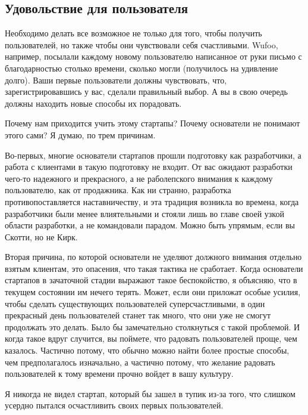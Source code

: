 \documentclass[ebook,12pt,oneside,openany]{memoir}
\begin{document}
\subsection{Удовольствие для пользователя}

Необходимо делать все возможное не только для того, чтобы получить
пользователей, но также чтобы они чувствовали себя счастливыми. Wufoo,
например, посылали каждому новому пользователю написанное от руки
письмо с благодарностью столько времени, сколько могли (получилось на
удивление долго). Ваши первые пользователи должны чувствовать, что,
зарегистрировавшись у вас, сделали правильный выбор. А вы в свою
очередь должны находить новые способы их порадовать. \newline

Почему нам приходится учить этому стартапы? Почему основатели не
понимают этого сами? Я думаю, по трем причинам. \newline

Во-первых, многие основатели стартапов прошли подготовку как
разработчики, а работа с клиентами в такую подготовку не входит. От
вас ожидают разработки чего-то надежного и прекрасного, а не
раболепского внимания к каждому пользователю, как от продажника. Как
ни странно, разработка противопоставляется наставничеству, и эта
традиция возникла во времена, когда разработчики были менее
влиятельными и стояли лишь во главе своей узкой области разработки, а
не командовали парадом. Можно быть упрямым, если вы Скотти, но не
Кирк. \newline

Вторая причина, по которой основатели не уделяют должного внимания
отдельно взятым клиентам, это опасения, что такая тактика не
сработает. Когда основатели стартапов в зачаточной стадии выражают
такое беспокойство, я объясняю, что в текущем состоянии им нечего
терять. Может, если они приложат особые усилия, чтобы сделать
существующих пользователей суперсчастливыми, в один прекрасный день
пользователей станет так много, что они уже не смогут продолжать это
делать. Было бы замечательно столкнуться с такой проблемой. И когда
такое вдруг случится, вы поймете, что радовать пользователей проще,
чем казалось. Частично потому, что обычно можно найти более простые
способы, чем предполагалось изначально, а частично потому, что желание
радовать пользователей к тому времени прочно войдет в вашу культуру.
\newline

Я никогда не видел стартап, который бы зашел в тупик из-за того, что
слишком усердно пытался осчастливить своих первых пользователей.
\newline
\end{document}
